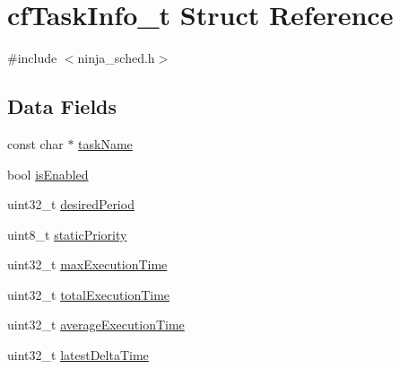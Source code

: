 \hypertarget{structcfTaskInfo__t}{\section{cf\+Task\+Info\+\_\+t Struct Reference}
\label{structcfTaskInfo__t}
}


{\ttfamily \#include $<$ninja\+\_\+sched.\+h$>$}

\subsection*{Data Fields}
\begin{DoxyCompactItemize}
\item 
const char $\ast$ \hyperlink{structcfTaskInfo__t_a01204081890201741afd6148cea6c9c1}{task\+Name}
\item 
bool \hyperlink{structcfTaskInfo__t_a071dc3019cb80e4f3f3f70091659b26a}{is\+Enabled}
\item 
uint32\+\_\+t \hyperlink{structcfTaskInfo__t_a1e7d7b440d632417a371159616fac9a5}{desired\+Period}
\item 
uint8\+\_\+t \hyperlink{structcfTaskInfo__t_a6a78cca089c4c76de82c650f042d8282}{static\+Priority}
\item 
uint32\+\_\+t \hyperlink{structcfTaskInfo__t_a42f42d3106a25a926cecb2f904702ff2}{max\+Execution\+Time}
\item 
uint32\+\_\+t \hyperlink{structcfTaskInfo__t_a1d67957929ae433be085102618f3ac80}{total\+Execution\+Time}
\item 
uint32\+\_\+t \hyperlink{structcfTaskInfo__t_a6bacfc5d581fca1f55d9dc18b7c7769e}{average\+Execution\+Time}
\item 
uint32\+\_\+t \hyperlink{structcfTaskInfo__t_a4ca3b1d7d10fef14a0ef9e0e8bc5d745}{latest\+Delta\+Time}
\end{DoxyCompactItemize}


